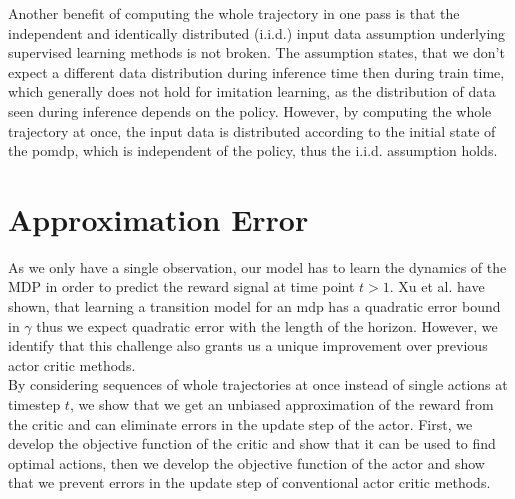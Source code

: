 Another benefit of computing the whole trajectory in one pass is that the independent and identically distributed (i.i.d.) input data 
assumption underlying supervised learning methods is not broken. The assumption states, that we don't expect a different data distribution during inference time 
then during train time, which generally does not hold for imitation learning, as the distribution of data seen during inference depends on the policy. 
However, by computing the whole trajectory at once, the input data is distributed according to the initial state of the \ac{pomdp}, which is independent of 
the policy, thus the i.i.d. assumption holds.\\

\section{Approximation Error}
\label{inference_time_planning}
As we only have a single observation, our model has to learn the dynamics of the MDP in order to predict the reward signal at time point $t > 1$. Xu et al. \cite{NEURIPS2020_b5c01503} 
have shown, that learning a transition model for an mdp has a quadratic error bound in $\gamma$ thus we expect quadratic error with the length of the horizon. 
However, we identify that this challenge also grants us a unique improvement over previous actor critic methods.\\ 

By considering sequences of whole trajectories at once instead of single actions 
at timestep $t$, 
we show that we get an unbiased approximation of the reward from the critic and can eliminate errors in the update step of the actor. First, we develop the objective function of the critic and 
show that it can be used to find optimal actions, then we develop the objective function of the actor and show that we prevent errors in the update step of conventional actor critic methods.\\


